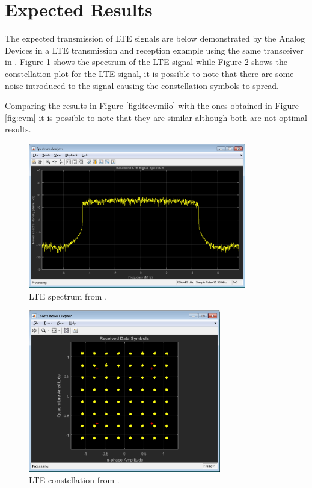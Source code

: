 \section{Expected Results}
\label{result:optimum}

The expected transmission of LTE signals are below demonstrated by the Analog
Devices in a LTE transmission and reception example using the same transceiver
in \cite{web:lteexamplewiki}. Figure \ref{fig:ltespectrumiio} shows the spectrum
of the LTE signal while Figure \ref{fig:lteconstellationiio}  shows the
constellation plot for the LTE signal, it is possible to note that there are
some noise introduced to the signal causing the constellation symbols to spread.

Comparing the results in Figure \ref{fig:lteevmiio} with the ones obtained in
Figure \ref{fig:evm} it is possible to note that they are similar although both
are not optimal results.

\begin{figure}[htbp]
    \centering
    \includegraphics[width=0.85\textwidth]{./figures/hsa}
    \caption{ LTE spectrum from \cite{web:lteexamplewiki}.
    \label{fig:ltespectrumiio}}
\end{figure}

\begin{figure}[htbp]
    \centering
    \includegraphics[width=0.75\textwidth]{./figures/hcd}
    \caption{ LTE constellation from \cite{web:lteexamplewiki}.
    \label{fig:lteconstellationiio}}
\end{figure}


